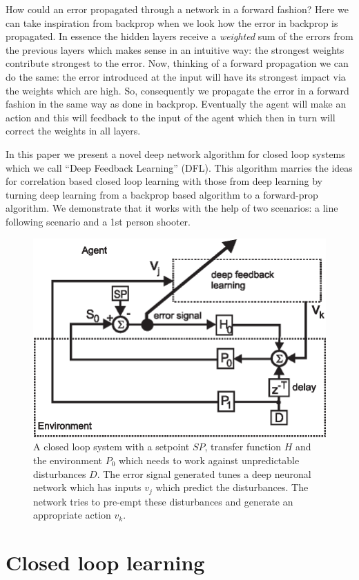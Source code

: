 \documentclass{llncs}
\begin{document}
How could an error propagated through a network in a forward fashion? Here we can
take inspiration from backprop when we look how the error in backprop is propagated.
In essence the hidden layers receive a \textsl{weighted} sum of the errors from the
previous layers which makes sense in an intuitive way: the strongest weights
contribute strongest to the error. Now, thinking of a forward propagation we
can do the same: the error introduced at the input will have its strongest
impact via the weights which are high. So, consequently we propagate the error
in a forward fashion in the same way as done in backprop. Eventually the agent
will make an action and this will feedback to the input of the agent which
then in turn will correct the weights in all layers.

In this paper we present a novel deep network algorithm for closed loop systems
which we call ``Deep Feedback Learning'' (DFL). This algorithm marries the
ideas for correlation based closed loop learning with those from deep learning
by turning deep learning from a backprop based algorithm to a forward-prop
algorithm. We demonstrate that it works with the help of two scenarios:
a line following scenario and a 1st person shooter.

\begin{figure}[h!]
  \centering
  \includegraphics[width=0.75\columnwidth]{closed_loop}
  \caption{A closed loop system with a setpoint $SP$, transfer function $H$ and the
    environment $P_0$ which needs to work against unpredictable disturbances $D$.
    The error signal generated tunes a deep neuronal network which has inputs
    $v_j$ which predict the disturbances. The network tries to pre-empt these
    disturbances and generate an appropriate action $v_k$.
    \label{closed_loop}}
\end{figure}

\section{Closed loop learning}
\end{document}
